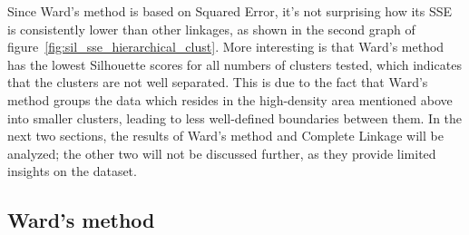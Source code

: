 Since Ward's method is based on Squared Error, it's not surprising how its SSE is consistently lower than other linkages, as shown in the second graph of figure~\ref{fig:sil_sse_hierarchical_clust}.
More interesting is that Ward's method has the lowest Silhouette scores for all numbers
of clusters tested, which indicates that the clusters are not well separated. This is due to
the fact that Ward's method groups the data which resides in the high-density area
mentioned above into smaller clusters, leading to less well-defined boundaries between them.
In the next two sections, the results of Ward's method and Complete Linkage will be analyzed;
the other two will not be discussed further, as they provide limited insights on the dataset.

\subsection{Ward's method}

